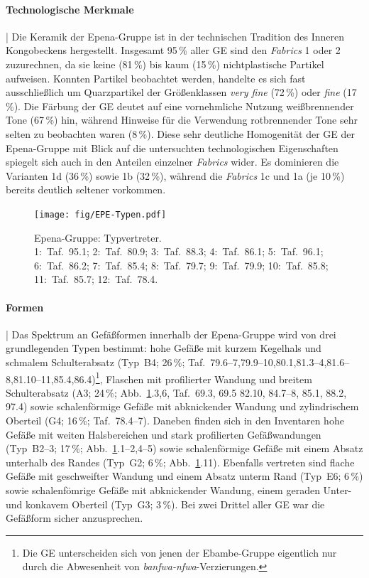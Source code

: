 \paragraph{Technologische Merkmale}\hspace{-.5em}|\hspace{.5em}%
Die Keramik der Epena-Gruppe ist in der technischen Tradition des Inneren Kongobeckens hergestellt. Insgesamt 95\,\% aller GE sind den \textit{Fabrics} 1 oder 2 zuzurechnen, da sie keine (81\,\%) bis kaum (15\,\%) nichtplastische Partikel aufweisen. Konnten Partikel beobachtet werden, handelte es sich fast ausschließlich um Quarzpartikel der Größenklassen \textit{very fine} (72\,\%) oder \textit{fine} (17\,\%). Die Färbung der GE deutet auf eine vornehmliche Nutzung weißbrennender Tone (67\,\%) hin, während Hinweise für die Verwendung rotbrennender Tone sehr selten zu beobachten waren (8\,\%). Diese sehr deutliche Homogenität der GE der Epena-Gruppe mit Blick auf die untersuchten technologischen Eigenschaften spiegelt sich auch in den Anteilen einzelner \textit{Fabrics} wider. Es dominieren die Varianten 1d (36\,\%) sowie 1b (32\,\%), während die \textit{Fabrics} 1c und 1a (je 10\,\%) bereits deutlich seltener vorkommen.

\begin{figure}[!tb]
	\centering
	\texttt{[image: fig/EPE-Typen.pdf]}
	\caption{Epena-Gruppe: Typvertreter.\\1:~Taf.~95.1; 2:~Taf.~80.9; 3:~Taf.~88.3; 4:~Taf.~86.1; 5:~Taf.~96.1; 6:~Taf.~86.2; 7:~Taf.~85.4; 8:~Taf.~79.7; 9:~Taf.~79.9; 10:~Taf.~85.8; 11:~Taf.~85.7; 12:~Taf.~78.4.}
	\label{fig:EPE_Typentafel}
\end{figure}

\paragraph{Formen}\hspace{-.5em}|\hspace{.5em}%
Das Spektrum an Gefäßformen innerhalb der Epena-Gruppe wird von drei grundlegenden Typen bestimmt: hohe Gefäße mit kurzem Kegelhals und schmalem Schulterabsatz (Typ~B4; 26\,\%; Taf.~79.6--7,79.9--10,80.1,81.3--4,81.6--8,81.10--11,85.4,86.4)\footnote{Die GE unterscheiden sich von jenen der Ebambe-Gruppe eigentlich nur durch die Abwesenheit von \textit{banfwa-nfwa}-Verzierungen.}, Flaschen mit profilierter Wandung und breitem Schulterabsatz (A3; 24\,\%; Abb.~\ref{fig:EPE_Typentafel}.3,6, Taf.~69.3, 69.5 82.10, 84.7--8, 85.1, 88.2, 97.4) sowie schalenförmige Gefäße mit abknickender Wandung und zylindrischem Oberteil (G4; 16\,\%; Taf.~78.4--7). Daneben finden sich in den Inventaren hohe Gefäße mit weiten Halsbereichen und stark profilierten Gefäßwandungen (Typ~B2--3; 17\,\%; Abb.~\ref{fig:EPE_Typentafel}.1--2,4--5) sowie schalenförmige Gefäße mit einem Absatz unterhalb des Randes (Typ~G2; 6\,\%; Abb.~\ref{fig:EPE_Typentafel}.11). Ebenfalls vertreten sind flache Gefäße mit geschweifter Wandung und einem Absatz unterm Rand (Typ~E6; 6\,\%) sowie schalenfömrige Gefäße mit abknickender Wandung, einem geraden Unter- und konkavem Oberteil (Typ~G3; 3\,\%). Bei zwei Drittel aller GE war die Gefäßform sicher anzusprechen.


